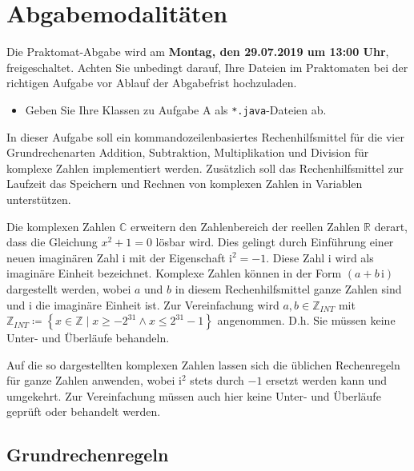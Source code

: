 \documentclass{sdqassignment}
\begin{document}

\section*{Abgabemodalitäten}

Die Praktomat-Abgabe wird am \textbf{Montag, den 29.07.2019 um 13:00 Uhr}, freigeschaltet. Achten Sie unbedingt darauf, Ihre Dateien im Praktomaten bei der richtigen Aufgabe vor Ablauf der Abgabefrist hochzuladen.

\begin{itemize}
    \item Geben Sie Ihre Klassen zu Aufgabe A als \texttt{*.java}-Dateien ab.
\end{itemize}




\newpage

In dieser Aufgabe soll ein kommandozeilenbasiertes Rechenhilfsmittel für die vier Grundrechenarten Addition, Subtraktion, Multiplikation und Division für komplexe Zahlen implementiert werden. Zusätzlich soll das Rechenhilfsmittel zur Laufzeit das Speichern und Rechnen von komplexen Zahlen in Variablen unterstützen.

Die komplexen Zahlen \(\mathbb{C}\) erweitern den Zahlenbereich der reellen Zahlen \(\mathbb{R}\) derart, dass die Gleichung \(x^{2}+1=0\) lösbar wird. Dies gelingt durch Einführung einer neuen imaginären Zahl \(\mathrm{i}\) mit der Eigenschaft \(\mathrm{i}^{2}=-1\). Diese Zahl \(\mathrm{i}\) wird als imaginäre Einheit bezeichnet. Komplexe Zahlen können in der Form \(\left(a+b\,\mathrm{i}\right)\) dargestellt werden, wobei \(a\) und \(b\) in diesem Rechenhilfsmittel ganze Zahlen sind und \(\mathrm{i}\) die imaginäre Einheit ist. Zur Vereinfachung wird \(a,b\in\mathbb{Z}_{INT}\) mit \(\mathbb{Z}_{INT}\coloneqq\left\{x\in\mathbb{Z}\mid x\geq-2^{31}\land x\leq2^{31}-1\right\}\) angenommen. D.h. Sie müssen keine Unter- und Überläufe behandeln.

Auf die so dargestellten komplexen Zahlen lassen sich die üblichen Rechenregeln für ganze Zahlen anwenden, wobei \(\mathrm{i}^{2}\) stets durch \(-1\) ersetzt werden kann und umgekehrt. Zur Vereinfachung müssen auch hier %
keine Unter- und Überläufe geprüft oder behandelt werden.

\subsection{Grundrechenregeln}
\end{document}
